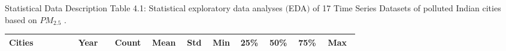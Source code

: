\documentclass[12pt, aspectratio=169]{beamer}
\begin{document}
\begin{frame}{Statistical Data Description}
	\centering
	\scriptsize {Table 4.1: Statistical exploratory data analyses $($EDA$)$ of 17 Time Series Datasets of polluted Indian cities based on $PM_{2.5}$ \cite{bhawan2020central}.}\\
	\begin{table}
		\begin{tabular}{|p{0.17\linewidth}|p{0.09\linewidth}|p{0.05\linewidth}|p{0.05\linewidth}|p{0.05\linewidth}|p{0.04\linewidth}|p{0.05\linewidth}|p{0.05\linewidth}|p{0.06\linewidth}|p{0.07\linewidth}|} \hline
		\footnotesize \textbf{Cities}&\footnotesize \textbf{Year} & \footnotesize \textbf{Count} & \footnotesize \textbf{Mean} & \footnotesize \textbf{Std} & \footnotesize \textbf{Min} & \footnotesize \textbf{25\%} &\footnotesize \textbf{50\%} &\footnotesize \textbf{75\%} & \footnotesize \textbf{Max}  \\ \hline
		

\end{tabular}
\end{table}
\end{frame}
\end{document}
